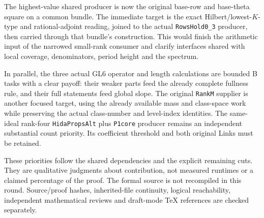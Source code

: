 The highest-value shared producer is now the original base-row
and base-theta square on a common bundle. The immediate target
is the exact Hilbert/lowest-$K$-type and rational-adjoint reading,
joined to the actual \texttt{RowsHold0\_3} producer, then carried
through that bundle's construction. This would finish the
arithmetic input of the narrowed small-rank consumer and clarify
interfaces shared with local coverage, denominators, period height
and the spectrum.

In parallel, the three actual GL6 operator and length calculations
are bounded B tasks with a clear payoff: their weaker parts feed
the already complete fullness rule, and their full statements
feed global slope. The original \texttt{RankM} supplier is another
focused target, using the already available mass and class-space
work while preserving the actual class-number and level-index
identities. The same-ideal rank-four \texttt{HidaPropsAlt} plus
\texttt{P1core} producer remains an independent substantial count
priority. Its coefficient threshold and both original Links must
be retained.

These priorities follow the shared dependencies and the explicit
remaining cuts. They are qualitative judgments about contribution,
not measured runtimes or a claimed percentage of the proof.
The formal source is not recompiled in this round. Source/proof
hashes, inherited-file continuity, logical reachability, independent
mathematical reviews and draft-mode TeX references are checked
separately.
